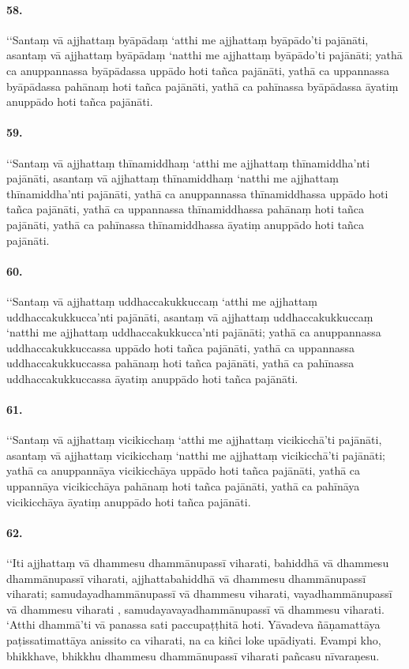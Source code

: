 \paragraph{58.} ‘‘Santaṃ vā ajjhattaṃ byāpādaṃ ‘atthi me ajjhattaṃ byāpādo’ti pajānāti, asantaṃ vā ajjhattaṃ byāpādaṃ ‘natthi me ajjhattaṃ byāpādo’ti pajānāti; yathā ca anuppannassa byāpādassa uppādo hoti tañca pajānāti, yathā ca uppannassa byāpādassa pahānaṃ hoti tañca pajānāti, yathā ca pahīnassa byāpādassa āyatiṃ anuppādo hoti tañca pajānāti.

\paragraph{59.} ‘‘Santaṃ vā ajjhattaṃ thīnamiddhaṃ ‘atthi me ajjhattaṃ thīnamiddha’nti pajānāti, asantaṃ vā ajjhattaṃ thīnamiddhaṃ ‘natthi me ajjhattaṃ thīnamiddha’nti pajānāti, yathā ca anuppannassa thīnamiddhassa uppādo hoti tañca pajānāti, yathā ca uppannassa thīnamiddhassa pahānaṃ hoti tañca pajānāti, yathā ca pahīnassa thīnamiddhassa āyatiṃ anuppādo hoti tañca pajānāti.

\paragraph{60.} ‘‘Santaṃ vā ajjhattaṃ uddhaccakukkuccaṃ ‘atthi me ajjhattaṃ uddhaccakukkucca’nti pajānāti, asantaṃ vā ajjhattaṃ uddhaccakukkuccaṃ ‘natthi me ajjhattaṃ uddhaccakukkucca’nti pajānāti; yathā ca anuppannassa uddhaccakukkuccassa uppādo hoti tañca pajānāti, yathā ca uppannassa uddhaccakukkuccassa pahānaṃ hoti tañca pajānāti, yathā ca pahīnassa uddhaccakukkuccassa āyatiṃ anuppādo hoti tañca pajānāti.

\paragraph{61.} ‘‘Santaṃ vā ajjhattaṃ vicikicchaṃ ‘atthi me ajjhattaṃ vicikicchā’ti pajānāti, asantaṃ vā ajjhattaṃ vicikicchaṃ ‘natthi me ajjhattaṃ vicikicchā’ti pajānāti; yathā ca anuppannāya vicikicchāya uppādo hoti tañca pajānāti, yathā ca uppannāya vicikicchāya pahānaṃ hoti tañca pajānāti, yathā ca pahīnāya vicikicchāya āyatiṃ anuppādo hoti tañca pajānāti.

\paragraph{62.} ‘‘Iti ajjhattaṃ vā dhammesu dhammānupassī viharati, bahiddhā vā dhammesu dhammānupassī viharati, ajjhattabahiddhā vā dhammesu dhammānupassī viharati; samudayadhammānupassī vā dhammesu viharati, vayadhammānupassī vā dhammesu viharati , samudayavayadhammānupassī vā dhammesu viharati. ‘Atthi dhammā’ti vā panassa sati paccupaṭṭhitā hoti. Yāvadeva ñāṇamattāya paṭissatimattāya anissito ca viharati, na ca kiñci loke upādiyati. Evampi kho, bhikkhave, bhikkhu dhammesu dhammānupassī viharati pañcasu nīvaraṇesu.

